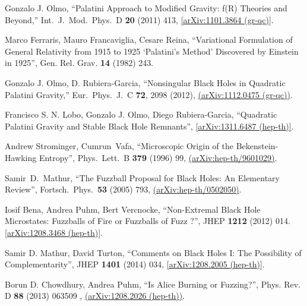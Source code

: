 \documentclass[12pt]{article}
\newcommand{\2}{$^2$}
\newcommand{\3}{$^3$}
\newcommand{\4}{$_4$}
\newcommand{\5}{$_5$}
\begin{document}
\begin{thebibliography}{400}
  Gonzalo J. Olmo,
  ``Palatini Approach to Modified Gravity: f(R) Theories and Beyond,''
  Int.\ J.\ Mod.\ Phys.\ D {\bf 20} (2011) 413, \href{http://arxiv.org/abs/1101.3864}
  {[arXiv:1101.3864 (gr-qc)]}.
	
Marco Ferraris, Mauro Francaviglia, Cesare Reina, ``Variational Formulation of General Relativity from 1915 to 1925 `Palatini's Method' Discovered by Einstein in 1925'', Gen. Rel. Grav. \textbf{14} (1982) 243.

Gonzalo J. Olmo, D. Rubiera-Garcia,
  ``Nonsingular Black Holes in Quadratic Palatini Gravity,''
  Eur.\ Phys.\ J.\ C {\bf 72}, 2098 (2012), \href{http://arxiv.org/abs/1112.0475}{
  (arXiv:1112.0475 (gr-qc))}.
	

Francisco S. N. Lobo, Gonzalo J. Olmo, Diego Rubiera-Garcia, ``Quadratic Palatini Gravity and Stable Black Hole Remnants'',  \href{http://arxiv.org/abs/1311.6487}{[arXiv:1311.6487 (hep-th)]}.

  Andrew Strominger, Cumrun~Vafa,
  ``Microscopic Origin of the Bekenstein-Hawking Entropy'',
  Phys.\ Lett.\ B {\bf 379} (1996) 99, \href{http://arxiv.org/abs/hep-th/9601029}{
  (arXiv:hep-th/9601029)}.

  Samir~D.~Mathur,
  ``The Fuzzball Proposal for Black Holes: An Elementary Review'',
  Fortsch.\ Phys.\  {\bf 53} (2005) 793, \href{http://arxiv.org/abs/hep-th/0502050}{
  (arXiv:hep-th/0502050)}.


Iosif Bena, Andrea Puhm, Bert Vercnocke, ``Non-Extremal Black Hole Microstates: Fuzzballs of Fire or Fuzzballs of Fuzz ?'', JHEP \textbf{1212} (2012) 014. \href{http://arxiv.org/abs/1208.3468}{[arXiv:1208.3468 (hep-th)]}.

Samir D. Mathur, David Turton,  ``Comments on Black Holes I: The Possibility of Complementarity'', JHEP \textbf{1401} (2014) 034, 
  \href{http://arxiv.org/abs/1208.2005}{[arXiv:1208.2005 (hep-th)]}.
	
  Borun D. Chowdhury, Andrea Puhm,
  ``Is Alice Burning or Fuzzing?'',  Phys. Rev. D \textbf{88} (2013) 063509 , \href{http://arxiv.org/abs/1208.2026}{
  (arXiv:1208.2026 (hep-th))}.
	

\end{thebibliography}
\end{document}
